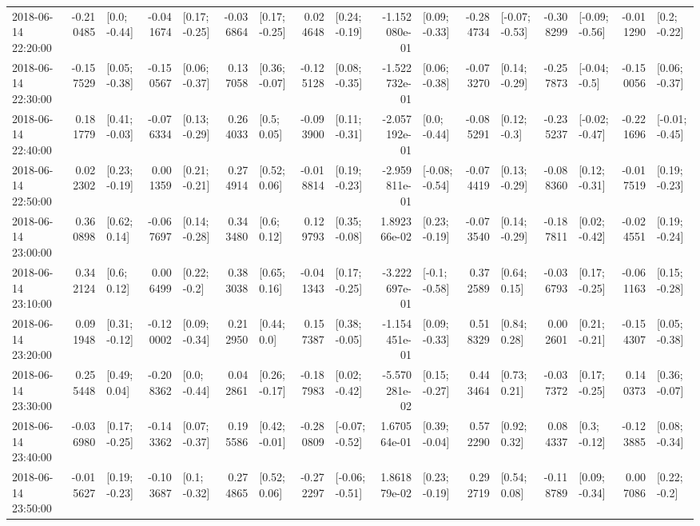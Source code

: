 \begin{tabular}{lrlrlrlrlrlrlrlrl}
2018-06-14 22:20:00 & -0.210485 &    [0.0; -0.44] & -0.041674 &   [0.17; -0.25] & -0.036864 &   [0.17; -0.25] &  0.024648 &   [0.24; -0.19] & -1.152080e-01 &   [0.09; -0.33] & -0.284734 &  [-0.07; -0.53] & -0.308299 &  [-0.09; -0.56] & -0.011290 &    [0.2; -0.22] \\
2018-06-14 22:30:00 & -0.157529 &   [0.05; -0.38] & -0.150567 &   [0.06; -0.37] &  0.137058 &   [0.36; -0.07] & -0.125128 &   [0.08; -0.35] & -1.522732e-01 &   [0.06; -0.38] & -0.073270 &   [0.14; -0.29] & -0.257873 &   [-0.04; -0.5] & -0.150056 &   [0.06; -0.37] \\
2018-06-14 22:40:00 &  0.181779 &   [0.41; -0.03] & -0.076334 &   [0.13; -0.29] &  0.264033 &     [0.5; 0.05] & -0.093900 &   [0.11; -0.31] & -2.057192e-01 &    [0.0; -0.44] & -0.085291 &    [0.12; -0.3] & -0.235237 &  [-0.02; -0.47] & -0.221696 &  [-0.01; -0.45] \\
2018-06-14 22:50:00 &  0.022302 &   [0.23; -0.19] &  0.001359 &   [0.21; -0.21] &  0.274914 &    [0.52; 0.06] & -0.018814 &   [0.19; -0.23] & -2.959811e-01 &  [-0.08; -0.54] & -0.074419 &   [0.13; -0.29] & -0.088360 &   [0.12; -0.31] & -0.017519 &   [0.19; -0.23] \\
2018-06-14 23:00:00 &  0.360898 &    [0.62; 0.14] & -0.067697 &   [0.14; -0.28] &  0.343480 &     [0.6; 0.12] &  0.129793 &   [0.35; -0.08] &  1.892366e-02 &   [0.23; -0.19] & -0.073540 &   [0.14; -0.29] & -0.187811 &   [0.02; -0.42] & -0.024551 &   [0.19; -0.24] \\
2018-06-14 23:10:00 &  0.342124 &     [0.6; 0.12] &  0.006499 &    [0.22; -0.2] &  0.383038 &    [0.65; 0.16] & -0.041343 &   [0.17; -0.25] & -3.222697e-01 &   [-0.1; -0.58] &  0.372589 &    [0.64; 0.15] & -0.036793 &   [0.17; -0.25] & -0.061163 &   [0.15; -0.28] \\
2018-06-14 23:20:00 &  0.091948 &   [0.31; -0.12] & -0.120002 &   [0.09; -0.34] &  0.212950 &     [0.44; 0.0] &  0.157387 &   [0.38; -0.05] & -1.154451e-01 &   [0.09; -0.33] &  0.518329 &    [0.84; 0.28] &  0.002601 &   [0.21; -0.21] & -0.154307 &   [0.05; -0.38] \\
2018-06-14 23:30:00 &  0.255448 &    [0.49; 0.04] & -0.208362 &    [0.0; -0.44] &  0.042861 &   [0.26; -0.17] & -0.187983 &   [0.02; -0.42] & -5.570281e-02 &   [0.15; -0.27] &  0.443464 &    [0.73; 0.21] & -0.037372 &   [0.17; -0.25] &  0.140373 &   [0.36; -0.07] \\
2018-06-14 23:40:00 & -0.036980 &   [0.17; -0.25] & -0.143362 &   [0.07; -0.37] &  0.195586 &   [0.42; -0.01] & -0.280809 &  [-0.07; -0.52] &  1.670564e-01 &   [0.39; -0.04] &  0.572290 &    [0.92; 0.32] &  0.084337 &    [0.3; -0.12] & -0.123885 &   [0.08; -0.34] \\
2018-06-14 23:50:00 & -0.015627 &   [0.19; -0.23] & -0.103687 &    [0.1; -0.32] &  0.274865 &    [0.52; 0.06] & -0.272297 &  [-0.06; -0.51] &  1.861879e-02 &   [0.23; -0.19] &  0.292719 &    [0.54; 0.08] & -0.118789 &   [0.09; -0.34] &  0.007086 &    [0.22; -0.2] \\
\bottomrule
\end{tabular}
